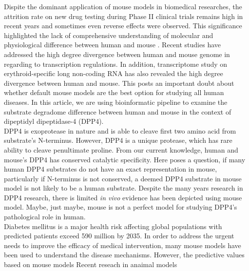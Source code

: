Dispite the dominant application of mouse models in biomedical researches, the attrition rate on new drug testing during Phase II clinical trials remains high in recent years \cite{Arrowsmith_2011} and sometimes even reverse effects were observed. This significance highlighted the lack of comprehensive understanding of molecular and physiological difference between human and mouse \cite{de_Magalh_es_2014}. Recent studies have addressed the high degree divergence between human and mouse genome in regarding to transcription regulations. \cite{25409824} In addition, transcriptome study on erythroid-specific long non-coding RNA has also revealed the high degree divergence between human and mouse. \cite{An_2015} This posts an important doubt about whether default mouse models are the best option for studying all human diseases. In this article, we are using bioinformatic pipeline to examine the substrate degradome difference between human and mouse in the context of dipeptidyl dipeptidase-4 (DPP4).  \\

DPP4 is exoprotease in nature and is able to cleave first two amino acid from substrate's N-terminus. However, DPP4 is a unique protease, which has rare ability to cleave penultimate proline. From our current knowledge, human and mouse's DPP4 has conserved catalytic specificity. Here poses a question, if many human DPP4 substrates do not have an exact representation in mouse, particularly if N-terminus is not conserved, a deemed DPP4 substrate in mouse model is not likely to be a human substrate. Despite the many years research in DPP4 research, there is limited \textit{in vivo} evidence has been depicted using mouse model. Maybe, just maybe, mouse is not a perfect model for studying DPP4's pathological role in human. \\

Diabetes mellitus is a major health risk affecting global populations with predicted patients exceed 590 million by 2035. \cite{IDF_Diabetes_Atlas_Group_2015} In order to address the urgent needs to improve the efficacy of medical intervention, many mouse models have been used to understand the disease mechanisms. However, the predictive values based on mouse models  Recent reseach in anaimal models 

\cite{Justice_2011}